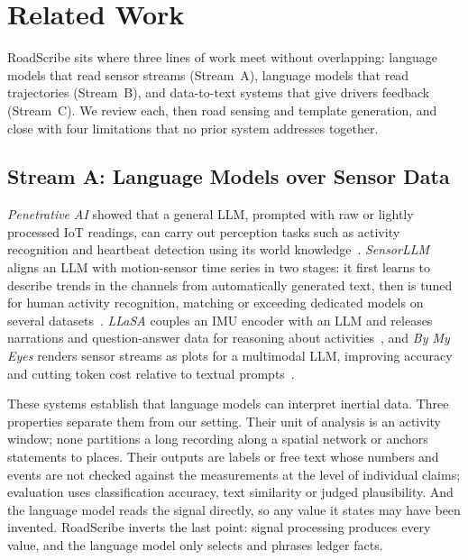 
\section{Related Work}
\label{sec:related}

RoadScribe sits where three lines of work meet without overlapping: language models that read sensor streams (Stream~A), language models that read trajectories (Stream~B), and data-to-text systems that give drivers feedback (Stream~C).
We review each, then road sensing and template generation, and close with four limitations that no prior system addresses together.

\subsection{Stream A: Language Models over Sensor Data}

\emph{Penetrative AI} showed that a general LLM, prompted with raw or lightly processed IoT readings, can carry out perception tasks such as activity recognition and heartbeat detection using its world knowledge~\cite{xu2024penetrative}.
\emph{SensorLLM} aligns an LLM with motion-sensor time series in two stages: it first learns to describe trends in the channels from automatically generated text, then is tuned for human activity recognition, matching or exceeding dedicated models on several datasets~\cite{li2025sensorllm}.
\emph{LLaSA} couples an IMU encoder with an LLM and releases narrations and question-answer data for reasoning about activities~\cite{imran2024llasa}, and \emph{By My Eyes} renders sensor streams as plots for a multimodal LLM, improving accuracy and cutting token cost relative to textual prompts~\cite{yoon2024bymyeyes}.

These systems establish that language models can interpret inertial data.
Three properties separate them from our setting.
Their unit of analysis is an activity window; none partitions a long recording along a spatial network or anchors statements to places.
Their outputs are labels or free text whose numbers and events are not checked against the measurements at the level of individual claims; evaluation uses classification accuracy, text similarity or judged plausibility.
And the language model reads the signal directly, so any value it states may have been invented.
RoadScribe inverts the last point: signal processing produces every value, and the language model only selects and phrases ledger facts.

